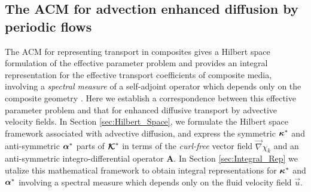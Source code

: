 \documentclass[11pt]{amsart}
\newcommand{\Ab}{\mathbf{A}}
\newcommand\Kbc{\mbox{\boldmath${\mathcal{K}}$}}
\newcommand\balpha{\mbox{\boldmath${\alpha}$}}
\newcommand\bkappa{\mbox{\boldmath${\kappa}$}}
\begin{document}
\subsection{The ACM for advection enhanced diffusion by periodic
  flows} \label{sec:ACM}   
%
The ACM for representing transport in composites gives a Hilbert space
formulation of the effective parameter problem and provides an
integral representation for the effective transport coefficients of
composite media, involving a \emph{spectral measure} of a self-adjoint
operator which depends only on the composite geometry
\cite{Golden:CMP-473,Murphy:JMP:063506,MILTON:2002:TC}. Here 
we establish a correspondence between this effective parameter problem
and that for enhanced diffusive transport by advective velocity
fields. In Section \ref{sec:Hilbert_Space}, we formulate the Hilbert
space framework associated with advective diffusion, and express the
symmetric $\bkappa^*$ and anti-symmetric $\balpha^*$ parts of $\Kbc^*$
in terms of the \emph{curl-free} vector field $\vec{\nabla}\chi_k$ and an
anti-symmetric integro-differential operator $\Ab$. In Section
\ref{sec:Integral_Rep} we utalize this mathematical framework 
to obtain integral representations for $\bkappa^*$ and $\balpha^*$
involving a spectral measure which depends only on the fluid velocity 
field $\vec{u}$.   
\end{document}
